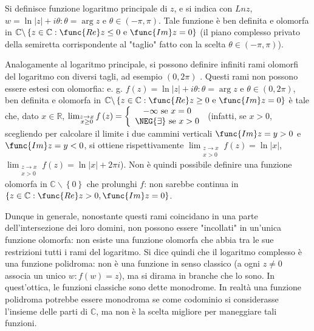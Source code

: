 \documentclass{article}
\begin{document}
Si definisce funzione logaritmo principale di $z$, e si indica con $Lnz$, $%
w=\ln \left\vert z\right\vert +i\theta :\theta =\arg z$ e $\theta \in \left(
-\pi ,\pi \right) $. Tale funzione \`{e} ben definita e olomorfa in $%
\mathbb{C}
\backslash \left\{ z\in 
\mathbb{C}
:\func{Re}z\leq 0\text{ e }\func{Im}z=0\right\} $ (il piano complesso
privato della semiretta corrispondente al "taglio" fatto con la scelta $%
\theta \in \left( -\pi ,\pi \right) $).

Analogamente al logaritmo principale, si possono definire infiniti rami
olomorfi del logaritmo con diversi tagli, ad esempio $\left( 0,2\pi \right) $%
. Questi rami non possono essere estesi con olomorfia: e. g. $f\left(
z\right) =\ln \left\vert z\right\vert +i\theta :\theta =\arg z$ e $\theta
\in \left( 0,2\pi \right) $, ben definita e olomorfa in $%
\mathbb{C}
\backslash \left\{ z\in 
\mathbb{C}
:\func{Re}z\geq 0\text{ e }\func{Im}z=0\right\} $ \`{e} tale che, dato $x\in 
\mathbb{R}
$, $\lim_{\substack{ z\rightarrow x  \\ x\geq 0}}f\left( z\right) =\left\{ 
\begin{array}{c}
-\infty \text{ se }x=0 \\ 
\NEG{\exists}\text{ se }x>0%
\end{array}%
\right. $ (infatti, se $x>0$, scegliendo per calcolare il limite i due
cammini verticali $\func{Im}z=y>0$ e $\func{Im}z=y<0$, si ottiene
rispettivamente $\lim_{\substack{ z\rightarrow x  \\ x>0}}f\left( z\right)
=\ln \left\vert x\right\vert $, $\lim_{\substack{ z\rightarrow x  \\ x>0}}%
f\left( z\right) =\ln \left\vert x\right\vert +2\pi i$). Non \`{e} quindi
possibile definire una funzione olomorfa in $%
\mathbb{C}
\backslash \left\{ 0\right\} $ che prolunghi $f$: non sarebbe continua in $%
\left\{ z\in 
\mathbb{C}
:\func{Re}z>0,\func{Im}z=0\right\} $.

Dunque in generale, nonostante questi rami coincidano in una parte
dell'intersezione dei loro domini, non possono essere "incollati" in
un'unica funzione olomorfa: non esiste una funzione olomorfa che abbia tra
le sue restrizioni tutti i rami del logaritmo. Si dice quindi che il
logaritmo complesso \`{e} una funzione polidroma: non \`{e} una funzione in
senso classico (a ogni $z\neq 0$ associa un unico $w:f\left( w\right) =z$),
ma si dirama in branche che lo sono. In quest'ottica, le funzioni classiche
sono dette monodrome. In realt\`{a} una funzione polidroma potrebbe essere
monodroma se come codominio si considerasse l'insieme delle parti di $%
\mathbb{C}
$, ma non \`{e} la scelta migliore per maneggiare tali funzioni.
\end{document}
